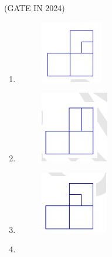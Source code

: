 \documentclass[journal,12pt,onecolumn]{IEEEtran}
\theoremstyle{remark}
\begin{document}
\begin{enumerate}
    \hfill{(GATE IN 2024)}
     \begin{multicols}{2}
    \begin{enumerate} 
        \item  
            
       \begin{figure}[H]
    \centering
    \includegraphics[width=0.5\columnwidth]{figs/p4.jpg}
    \caption{}
    \label{fig:p4}
\end{figure}
        \item  

           \begin{figure}[H]
    \centering
    \includegraphics[width=0.5\columnwidth]{figs/p5.jpg}
    \caption{}
    \label{fig:p5}
\end{figure}
        \item  

          \begin{figure}[H]
    \centering
    \includegraphics[width=0.5\columnwidth]{figs/p6.jpg}
    \caption{}
    \label{fig:p6}
\end{figure}
        \item 


\end{enumerate}
\end{multicols}
\end{enumerate}
\end{document}
